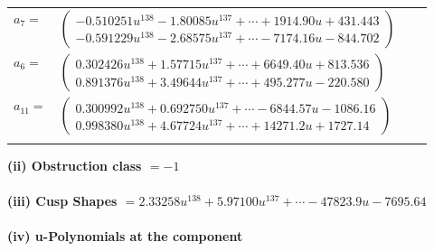 \documentclass[1p]{elsarticle_modified}
\theoremstyle{definition}
\begin{document}
\begin{tabular}{m{7pt} m{180pt} m{7pt} m{180pt} }
\flushright $a_{7}=$&$\begin{pmatrix}-0.510251 u^{138}-1.80085 u^{137}+\cdots+1914.90 u+431.443\\-0.591229 u^{138}-2.68575 u^{137}+\cdots-7174.16 u-844.702\end{pmatrix}$ \\
\flushright $a_{6}=$&$\begin{pmatrix}0.302426 u^{138}+1.57715 u^{137}+\cdots+6649.40 u+813.536\\0.891376 u^{138}+3.49644 u^{137}+\cdots+495.277 u-220.580\end{pmatrix}$ \\
\flushright $a_{11}=$&$\begin{pmatrix}0.300992 u^{138}+0.692750 u^{137}+\cdots-6844.57 u-1086.16\\0.998380 u^{138}+4.67724 u^{137}+\cdots+14271.2 u+1727.14\end{pmatrix}$\\&\end{tabular}
\flushleft \textbf{(ii) Obstruction class $= -1$}\\~\\
\flushleft \textbf{(iii) Cusp Shapes $= 2.33258 u^{138}+5.97100 u^{137}+\cdots-47823.9 u-7695.64$}\\~\\
\newpage\renewcommand{\arraystretch}{1}
\flushleft \textbf{(iv) u-Polynomials at the component}\newline \\
\end{document}
